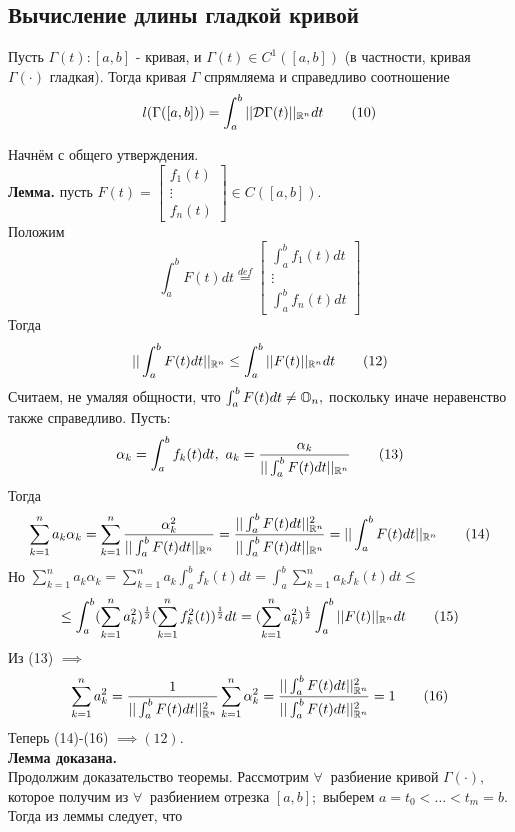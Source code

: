 \documentclass[main]{subfiles}
\begin{document}
\subsection{Вычисление длины гладкой кривой}
\begin{theorem}
     Пусть $\Gamma(t):[a,b]$ - кривая, и $\Gamma(t)\in C^1([a,b])$ (в частности, кривая $\Gamma(\cdot)$ гладкая). Тогда кривая $\Gamma$ спрямляема и справедливо соотношение
\[ l(\Gamma([a,b]))=\int_a^b||\mathcal{D}\Gamma(t)||_{\mathbb{R}^n} dt \tag{10} \] 
\end{theorem}
\begin{longProof}
     Начнём с общего утверждения.
\\ \textbf{Лемма.} пусть $F(t)=\begin{bmatrix}
f_1(t)\\\vdots\\f_n(t)
\end{bmatrix}\in C([a,b]).$\\
Положим \[\int_a^b F(t)dt\overset{def}{=}\begin{bmatrix}\int_a^b f_1(t)dt\\\vdots\\\int_a^b f_n(t)dt\end{bmatrix}\tag{11}\]
Тогда \[ ||\int_a^b F(t)dt||_{\mathbb{R}^n}\leq \int_a^b ||F(t)||_{\mathbb{R}^n} dt\tag{12}\]
 Считаем, не умаляя общности, что $\int_a^b F(t)dt\ne\mathbb{O}_n,$ поскольку иначе неравенство также справедливо. Пусть: \[ \alpha_k =\int_a^b f_k(t)dt,\ a_k=\frac{\alpha_k}{||\int_a^b F(t)dt||_{\vR^n}}\tag{13}\]
Тогда \[ \sum\limits_{k=1}^n a_k\alpha_k=\sum\limits_{k=1}^n \frac{\alpha_k^2}{||\int_a^b F(t)dt||_{\mathbb{R}^n}}=\frac{||\int_a^b F(t)dt||^2_{\mathbb{R}^n}}{||\int_a^b F(t)dt||_{\mathbb{R}^n}}=||\int_a^b F(t)dt||_{\mathbb{R}^n}\tag{14}\]
Но \( \sum\limits_{k=1}^n a_k\alpha_k=\sum\limits_{k=1}^n a_k\int_a^b f_k(t)dt=\int_a^b\sum\limits_{k=1}^n a_k f_k(t)dt\leq\) \[ \leq \int_a^b(\sum\limits_{k=1}^n a_k^2)^\frac{1}{2}(\sum\limits_{k=1}^n f_k^2(t))^\frac{1}{2}dt=(\sum\limits_{k=1}^n a_k^2)^\frac{1}{2}\int_a^b|| F(t)||_{\mathbb{R}^n} dt\tag{15} \]
Из (13) $\implies$ \[ \sum\limits_{k=1}^n a_k^2=\frac{1}{||\int_a^b F(t)dt||^2_{\mathbb{R}^n}}\sum\limits_{k=1}^n \alpha_k^2=\frac{||\int_a^b F(t)dt||_{\mathbb{R}^n}^2}{||\int_a^b F(t)dt||^2_{\mathbb{R}^n}}=1\tag{16} \]
Теперь (14)-(16) $\implies (12).$ \\\textbf{Лемма доказана.}\\
Продолжим доказательство теоремы.
Рассмотрим $\forall\ $ разбиение кривой $\Gamma(\cdot),$ которое получим из $\forall\ $
разбиением отрезка $[a,b];$ выберем $a=t_0<\dots<t_m=b.$ Тогда из леммы следует, что

\end{longProof}
\end{document}
